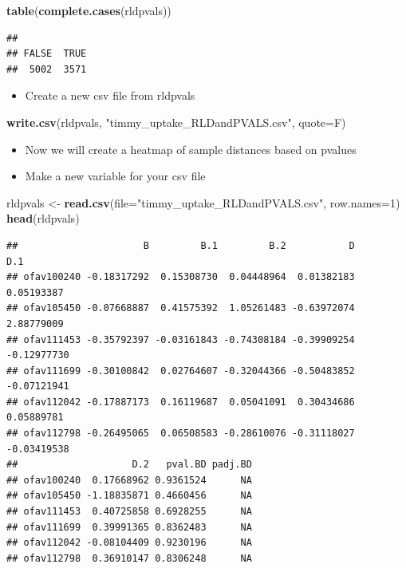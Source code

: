 \documentclass[
]{article}
\newenvironment{Shaded}{\begin{snugshade}}{\end{snugshade}}
\newcommand{\DataTypeTok}[1]{\textcolor[rgb]{0.13,0.29,0.53}{#1}}
\newcommand{\DecValTok}[1]{\textcolor[rgb]{0.00,0.00,0.81}{#1}}
\newcommand{\KeywordTok}[1]{\textcolor[rgb]{0.13,0.29,0.53}{\textbf{#1}}}
\newcommand{\NormalTok}[1]{#1}
\newcommand{\StringTok}[1]{\textcolor[rgb]{0.31,0.60,0.02}{#1}}
\providecommand{\tightlist}{%
  \setlength{\itemsep}{0pt}\setlength{\parskip}{0pt}}
\begin{document}
\begin{Shaded}
\begin{Highlighting}[]
\KeywordTok{table}\NormalTok{(}\KeywordTok{complete.cases}\NormalTok{(rldpvals))}
\end{Highlighting}
\end{Shaded}

\begin{verbatim}
## 
## FALSE  TRUE 
##  5002  3571
\end{verbatim}

\begin{itemize}
\tightlist
\item
  Create a new csv file from rldpvals
\end{itemize}

\begin{Shaded}
\begin{Highlighting}[]
\KeywordTok{write.csv}\NormalTok{(rldpvals, }\StringTok{"timmy_uptake_RLDandPVALS.csv"}\NormalTok{, }\DataTypeTok{quote=}\NormalTok{F)}
\end{Highlighting}
\end{Shaded}

\begin{itemize}
\tightlist
\item
  Now we will create a heatmap of sample distances based on pvalues
\item
  Make a new variable for your csv file
\end{itemize}

\begin{Shaded}
\begin{Highlighting}[]
\NormalTok{rldpvals <-}\StringTok{ }\KeywordTok{read.csv}\NormalTok{(}\DataTypeTok{file=}\StringTok{"timmy_uptake_RLDandPVALS.csv"}\NormalTok{, }\DataTypeTok{row.names=}\DecValTok{1}\NormalTok{)}
\KeywordTok{head}\NormalTok{(rldpvals)}
\end{Highlighting}
\end{Shaded}

\begin{verbatim}
##                      B         B.1         B.2           D         D.1
## ofav100240 -0.18317292  0.15308730  0.04448964  0.01382183  0.05193387
## ofav105450 -0.07668887  0.41575392  1.05261483 -0.63972074  2.88779009
## ofav111453 -0.35792397 -0.03161843 -0.74308184 -0.39909254 -0.12977730
## ofav111699 -0.30100842  0.02764607 -0.32044366 -0.50483852 -0.07121941
## ofav112042 -0.17887173  0.16119687  0.05041091  0.30434686  0.05889781
## ofav112798 -0.26495065  0.06508583 -0.28610076 -0.31118027 -0.03419538
##                    D.2   pval.BD padj.BD
## ofav100240  0.17668962 0.9361524      NA
## ofav105450 -1.18835871 0.4660456      NA
## ofav111453  0.40725858 0.6928255      NA
## ofav111699  0.39991365 0.8362483      NA
## ofav112042 -0.08104409 0.9230196      NA
## ofav112798  0.36910147 0.8306248      NA
\end{verbatim}
\end{document}
